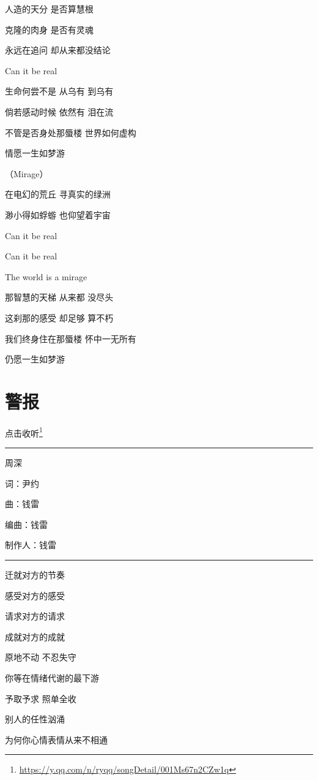 \documentclass[]{ctexbook}
\renewcommand{\href}[2]{#2\footnote{\url{#1}}}
\begin{document}
人造的天分 是否算慧根

克隆的肉身 是否有灵魂

永远在追问 却从来都没结论

Can it be real

生命何尝不是 从乌有 到乌有

倘若感动时候 依然有 泪在流

不管是否身处那蜃楼 世界如何虚构

情愿一生如梦游

（Mirage）

在电幻的荒丘 寻真实的绿洲

渺小得如蜉蝣 也仰望着宇宙

Can it be real

Can it be real

The world is a mirage

那智慧的天梯 从来都 没尽头

这刹那的感受 却足够 算不朽

我们终身住在那蜃楼 怀中一无所有

仍愿一生如梦游

\section*{警报}\label{the-giver}


\href{https://y.qq.com/n/ryqq/songDetail/001Ms67n2CZw1q}{点击收听}

\begin{center}\rule{0.5\linewidth}{0.5pt}\end{center}

周深

词：尹约

曲：钱雷

编曲：钱雷

制作人：钱雷

\begin{center}\rule{0.5\linewidth}{0.5pt}\end{center}

迁就对方的节奏

感受对方的感受

请求对方的请求

成就对方的成就

原地不动 不忍失守

你等在情绪代谢的最下游

予取予求 照单全收

别人的任性汹涌

为何你心情表情从来不相通
\end{document}
